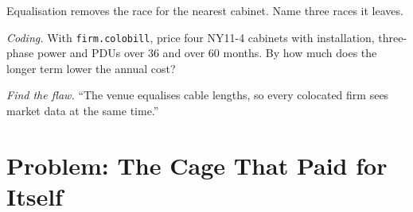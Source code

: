 \begin{exercise}[$\star\star$]\label{exo:nw:colocation-products-and-how-they-are-sold:6}
Equalisation removes the race for the nearest cabinet. Name three races it leaves.
\end{exercise}

\begin{exercise}[$\star\star\star$]\label{exo:nw:colocation-products-and-how-they-are-sold:7}
\emph{Coding.} With \texttt{firm.colobill}, price four NY11-4 cabinets with installation, three-phase power and PDUs over 36 and over 60
months. By how much does the longer term lower the annual cost?
\end{exercise}

\begin{exercise}[$\star\star\star$]\label{exo:nw:colocation-products-and-how-they-are-sold:8}
\emph{Find the flaw.} ``The venue equalises cable lengths, so every colocated firm sees market data at the same time.''
\end{exercise}

\section{Problem: The Cage That Paid for Itself}

